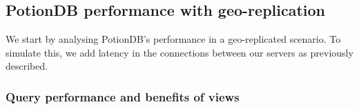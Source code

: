 \documentclass[sigconf, nonacm]{acmart}
\begin{document}
%

\subsection{PotionDB performance with geo-replication}

We start by analysing PotionDB's performance in a geo-replicated scenario.
To simulate this, we add latency in the connections between our servers as previously described.

\subsubsection{Query performance and benefits of views}
\end{document}
